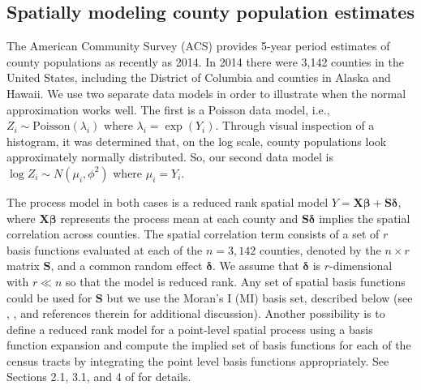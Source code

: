 \documentclass[12pt]{article}
\begin{document}
\subsection{Spatially modeling county population estimates}\label{sec:pop}
The American Community Survey (ACS) provides 5-year period estimates of county populations as recently as 2014. In 2014 there were 3,142 counties in the United States, including the District of Columbia and counties in Alaska and Hawaii. We use two separate data models in order to illustrate when the normal approximation works well. The first is a Poisson data model, i.e., $Z_i \sim \mathrm{Poisson}(\lambda_i)$ where $\lambda_i = \exp(Y_i)$. Through visual inspection of a histogram, it was determined that, on the log scale, county populations look approximately normally distributed. So, our second data model is $\log Z_i \sim N(\mu_i, \phi^2)$ where $\mu_i = Y_i$. 

The process model in both cases is a reduced rank spatial model $Y = \bm{X}\bm{\beta} + \bm{S}\bm{\delta}$, where $\bm{X}\bm{\beta}$ represents the process mean at each county and $\bm{S}\bm{\delta}$ implies the spatial correlation across counties. The spatial correlation term consists of a set of $r$ basis functions evaluated at each of the $n=3,142$ counties, denoted by the $n\times r$ matrix $\bm{S}$, and a common random effect $\bm{\delta}$. We assume that $\bm{\delta}$ is $r$-dimensional with $r \ll n$ so that the model is reduced rank. Any set of spatial basis functions could be used for $\bm{S}$ but we use the Moran's I (MI) basis set, described below (see \citet{hughes2013dimension}, \citet{porter2015bayesian}, \citet{bradley2015multivariate} and references therein for additional discussion). Another possibility is to define a reduced rank model for a point-level spatial process using a basis function expansion and compute the implied set of basis functions for each of the census tracts by integrating the point level basis functions appropriately. See Sections 2.1, 3.1, and 4 of \citet{bradley2016regionalization} for details.
\end{document}

